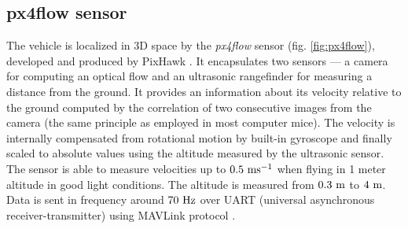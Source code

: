 \subsection{px4flow sensor}
\label{cap:px4flow}

The vehicle is localized in 3D space by the \textit{px4flow} sensor \citep{px4flow, honegger2013open} (fig. \ref{fig:px4flow}), developed and produced by PixHawk \citep{pixhawk}. It encapsulates two sensors --- a camera for computing an optical flow and an ultrasonic rangefinder for measuring a distance from the ground. It provides an information about its velocity relative to the ground computed by the correlation of two consecutive images from the camera (the same principle as employed in most computer mice). The velocity is internally compensated from rotational motion by built-in gyroscope and finally scaled to absolute values using the altitude measured by the ultrasonic sensor. The sensor is able to measure velocities up to $0.5~\mathrm{ms^{-1}}$ when flying in 1 meter altitude in good light conditions. The altitude is measured from $0.3~\mathrm{m}$ to $4~\mathrm{m}$. Data is sent in frequency around $70~\mathrm{Hz}$ over UART (universal asynchronous receiver-transmitter) using MAVLink protocol \citep{px4flow}.

